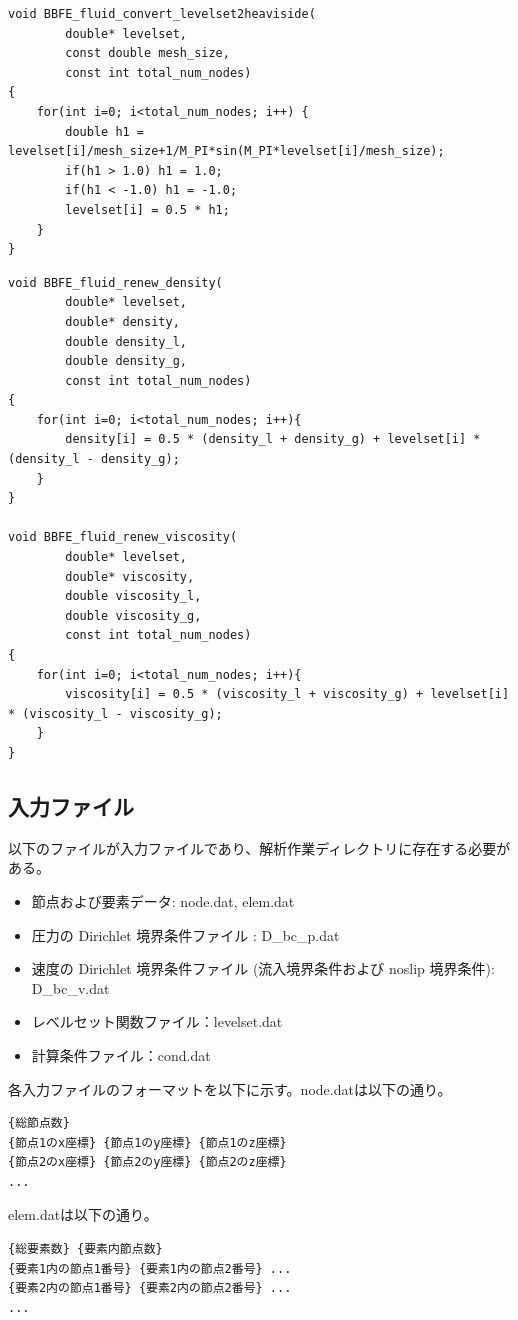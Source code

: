 \documentclass[8pt,a4paper]{article}
\begin{document}
\begin{lstlisting}[caption = mlflow\_core.cのレベルセット関数の近似Heaviside関数による平滑化計算]
void BBFE_fluid_convert_levelset2heaviside(
		double* levelset,
		const double mesh_size,
		const int total_num_nodes)
{
	for(int i=0; i<total_num_nodes; i++) {
		double h1 = levelset[i]/mesh_size+1/M_PI*sin(M_PI*levelset[i]/mesh_size);
		if(h1 > 1.0) h1 = 1.0;
		if(h1 < -1.0) h1 = -1.0;
		levelset[i] = 0.5 * h1;
	}
}
\end{lstlisting}

\begin{lstlisting}[caption = mlflow\_core.cの密度と粘性の計算]
void BBFE_fluid_renew_density(
		double* levelset,
		double* density,
		double density_l,
		double density_g,
		const int total_num_nodes)
{
	for(int i=0; i<total_num_nodes; i++){
		density[i] = 0.5 * (density_l + density_g) + levelset[i] * (density_l - density_g);
	}
}

void BBFE_fluid_renew_viscosity(
		double* levelset,
		double* viscosity,
		double viscosity_l,
		double viscosity_g,
		const int total_num_nodes)
{
	for(int i=0; i<total_num_nodes; i++){
		viscosity[i] = 0.5 * (viscosity_l + viscosity_g) + levelset[i] * (viscosity_l - viscosity_g);
	}
}
\end{lstlisting}

\subsection{入力ファイル}
以下のファイルが入力ファイルであり、解析作業ディレクトリに存在する必要がある。
\begin{itemize}
	\item 節点および要素データ: node.dat, elem.dat
	\item 圧力の Dirichlet 境界条件ファイル : D\_bc\_p.dat
	\item 速度の Dirichlet 境界条件ファイル (流入境界条件および noslip 境界条件): D\_bc\_v.dat
	\item レベルセット関数ファイル：levelset.dat
	\item 計算条件ファイル：cond.dat
\end{itemize}

各入力ファイルのフォーマットを以下に示す。node.datは以下の通り。
\begin{lstlisting}[]
{総節点数}
{節点1のx座標} {節点1のy座標} {節点1のz座標}
{節点2のx座標} {節点2のy座標} {節点2のz座標}
...
\end{lstlisting}

elem.datは以下の通り。
\begin{lstlisting}[]
{総要素数} {要素内節点数}
{要素1内の節点1番号} {要素1内の節点2番号} ...
{要素2内の節点1番号} {要素2内の節点2番号} ...
...
\end{lstlisting}
\end{document}
